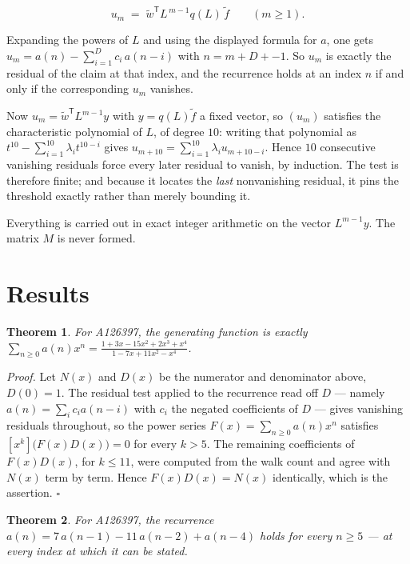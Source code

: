 \documentclass[11pt]{article}
\newtheorem{theorem}{Theorem}
\theoremstyle{definition}
\begin{document}
\[u_m \;=\; \tilde w^{\mathsf T} L^{\,m-1} q(L)\,\tilde f \qquad (m \ge 1).\]

Expanding the powers of $L$ and using the displayed formula for $a$, one gets $u_m = a(n) - \sum_{i=1}^{D} c_i\,a(n-i)$ with $n = m + D + -1$. So $u_m$ is exactly the residual of the claim at that index, and the recurrence holds at an index $n$ if and only if the corresponding $u_m$ vanishes.

Now $u_m = \tilde w^{\mathsf T} L^{m-1} y$ with $y = q(L)\tilde f$ a fixed vector, so $(u_m)$ satisfies the characteristic polynomial of $L$, of degree $10$: writing that polynomial as $t^{10} - \sum_{i=1}^{10} \lambda_i t^{10-i}$ gives $u_{m+10} = \sum_{i=1}^{10} \lambda_i u_{m+10-i}$. Hence $10$ consecutive vanishing residuals force every later residual to vanish, by induction. The test is therefore finite; and because it locates the {\itshape last} nonvanishing residual, it pins the threshold exactly rather than merely bounding it.

Everything is carried out in exact integer arithmetic on the vector $L^{m-1}y$. The matrix $M$ is never formed.

\section{Results}

\begin{theorem} For A126397, the generating function is exactly $\sum_{n\ge 0} a(n)x^n = \frac{1 + 3x - 15x^{2} + 2x^{3} + x^{4}}{1 - 7x + 11x^{2} - x^{4}}$.\end{theorem}

{\itshape Proof.} Let $N(x)$ and $D(x)$ be the numerator and denominator above, $D(0)=1$. The residual test applied to the recurrence read off $D$ --- namely $a(n) = \sum_i c_i a(n-i)$ with $c_i$ the negated coefficients of $D$ --- gives vanishing residuals throughout, so the power series $F(x)=\sum_{n\ge 0}a(n)x^n$ satisfies $[x^k]\bigl(F(x)D(x)\bigr) = 0$ for every $k > 5$. The remaining coefficients of $F(x)D(x)$, for $k \le 11$, were computed from the walk count and agree with $N(x)$ term by term. Hence $F(x)D(x) = N(x)$ identically, which is the assertion. $\square$

\begin{theorem} For A126397, the recurrence $a(n) = 7\,a(n-1) - 11\,a(n-2) + a(n-4)$ holds for every $n \ge 5$ --- at every index at which it can be stated.\end{theorem}
\end{document}
